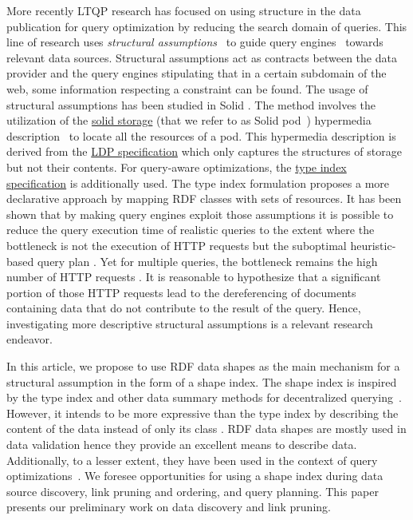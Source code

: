 More recently LTQP research has focused on using structure in the data publication for query optimization by reducing the search domain of queries.
This line of research uses \emph{structural assumptions}~\cite{Taelman2023} to guide query engines~\cite{verborgh2020guided} towards relevant data sources.
Structural assumptions act as contracts between the data provider and the query engines stipulating that in a certain subdomain of the web, some information respecting a constraint can be found.
The usage of structural assumptions has been studied in Solid \cite{Taelman2023}.
The method involves the utilization of the 
\href{https://solidproject.org/TR/protocol#resources}{solid storage} (that we refer to as Solid pod~\cite{Taelman2023}) hypermedia description~\cite{Fielding}
to locate all the resources of a pod. 
This hypermedia description is derived from the \href{https://www.w3.org/TR/ldp/}{LDP specification}
which only captures the structures of storage but not their contents.
For query-aware optimizations, the \href{https://solid.github.io/type-indexes/}{type index specification} is additionally used.
The type index formulation proposes a more declarative approach \cite{Taelman2017} by mapping RDF classes with sets of resources.
It has been shown that by making query engines exploit those assumptions it is possible to reduce the query execution time
of realistic queries to the extent where the bottleneck is not the execution of 
HTTP requests but the suboptimal heuristic-based query plan \cite{eschauzier_quweda_2023, Taelman2023}.
Yet for multiple queries, the bottleneck remains the high number of HTTP requests  \cite{eschauzier_quweda_2023}.
It is reasonable to hypothesize that a significant portion of those HTTP requests lead to the dereferencing of
documents containing data that do not contribute to the result of the query.
Hence, investigating more descriptive structural assumptions is a relevant research endeavor.

In this article, we propose to use RDF data shapes as the main mechanism for a structural assumption in the form of a shape index.
The shape index is inspired by the type index and other data summary methods for decentralized querying~\cite{Stuckenschmidt2004,Goldman1997, Harth2010}.
However, it intends to be more expressive than the type index by describing the content of the data instead of only its class \cite{Taelman2017}.
RDF data shapes are mostly used in data validation \cite{Gayo2018a} hence they provide an excellent means to describe data.
Additionally, to a lesser extent, they have been used in the context of query optimizations~\cite{kashif2021}.
We foresee opportunities for using a shape index during data source discovery, link pruning and ordering, and query planning.
This paper presents our preliminary work on data discovery and link pruning.
